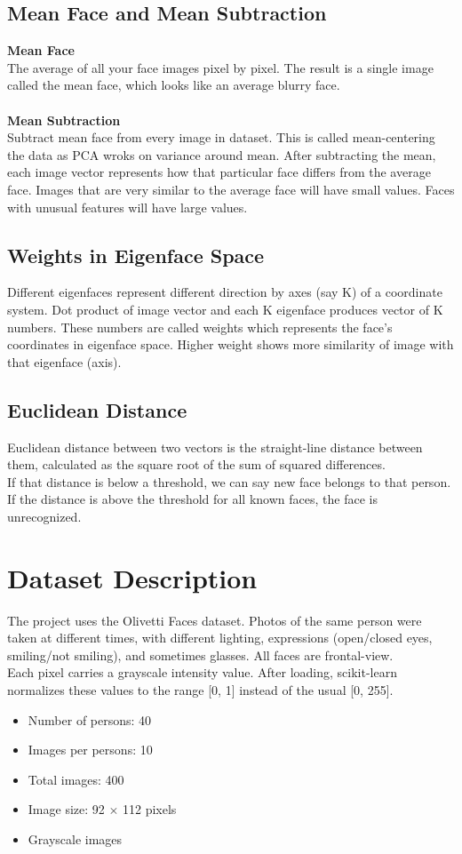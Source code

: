 \documentclass[12pt,a4paper]{article}
\begin{document}
\subsection{Mean Face and Mean Subtraction}
\textbf{Mean Face} 
\\
The average of all your face images pixel by pixel. The result is a single image called the mean face, which looks like an average blurry face.
\\\\
\textbf{Mean Subtraction}\\
Subtract mean face from every image in dataset. This is called mean-centering the data as PCA wroks on variance around mean.
After subtracting the mean, each image vector represents how that particular face differs from the average face.
Images that are very similar to the average face will have small values. Faces with unusual features will have large values.

\subsection{Weights in Eigenface Space}
Different eigenfaces represent different direction by axes (say K) of a coordinate system.
Dot product of image vector and each K eigenface produces vector of K numbers. These
numbers are called weights which represents the face's coordinates in eigenface space.
Higher weight shows more similarity of image with that eigenface (axis).

\subsection{Euclidean Distance}
Euclidean distance between two vectors is the straight-line distance between them, calculated as the square root of the sum of squared differences.
\\
If that distance is below a threshold, we can say new face belongs to that person. 
If the distance is above the threshold for all known faces, the face is unrecognized.



\section{Dataset Description}

The project uses the Olivetti Faces dataset. Photos of the same person were taken at different times, 
with different lighting, expressions (open/closed eyes, smiling/not smiling), and sometimes glasses.
All faces are frontal-view.
\\
Each pixel carries a grayscale intensity value. After loading, scikit-learn normalizes these values to the range [0, 1] instead of the usual [0, 255].
\begin{itemize}
\item Number of persons: 40
\item Images per persons: 10
\item Total images: 400
\item Image size: 92 $\times$ 112 pixels
\item Grayscale images
\end{itemize}
\end{document}
